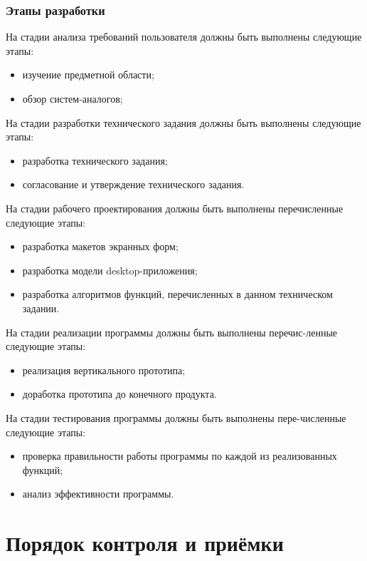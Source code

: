 \documentclass[14pt]{extarticle}        %
\begin{document}
\subsubsection{Этапы разработки}
На стадии анализа требований пользователя должны быть выполнены следующие этапы:
\begin{itemize}
    \item изучение предметной области;
    \item обзор систем-аналогов;
\end{itemize}\par
На стадии разработки технического задания должны быть выполнены следующие этапы:
\begin{itemize}
    \item разработка технического задания;
    \item согласование и утверждение технического задания.
\end{itemize}\par
На стадии рабочего проектирования должны быть выполнены перечисленные следующие этапы:
\begin{itemize}
    \item разработка макетов экранных форм;
    \item разработка модели desktop-приложения;
    \item разработка алгоритмов функций, перечисленных в данном техническом задании.
\end{itemize}\par
На стадии реализации программы должны быть выполнены перечис-ленные следующие этапы:
\begin{itemize}
    \item реализация вертикального прототипа;
    \item доработка прототипа до конечного продукта.
\end{itemize}\par
На стадии тестирования программы должны быть выполнены пере-численные следующие этапы:
\begin{itemize}
    \item проверка правильности работы программы по каждой из реализованных функций;
    \item анализ эффективности программы.
\end{itemize}

\newpage

\section {Порядок контроля и приёмки}
\end{document}
